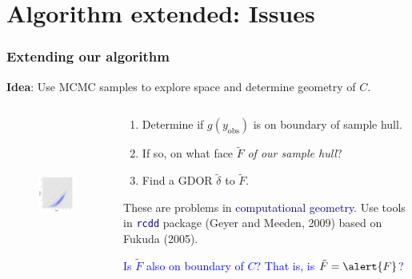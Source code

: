 \documentclass[ 10pt]{beamer}
\newcommand{\yobs}{y_{\text{obs}}}
\begin{document}
\section{Algorithm extended: Issues}
\frame
{
\frametitle{Extending our algorithm}  

\textbf{Idea}: Use MCMC samples to explore space and
determine geometry of $C$.
\vspace{1mm}

\begin{columns}[]
\begin{column}[T]{0.3\textwidth}
\begin{figure}[h]
\centering
\includegraphics[height=2in, trim=2.5in 1in 1in 1.9in, clip = true ]{MCsample-interiorptonF} %
\end{figure}
\end{column}

\begin{column}[t]{0.7\textwidth}
\pause

\begin{enumerate}
\item Determine if $g(\yobs)$ is on boundary of sample hull.
\vspace{2mm}
\item If so, on what face $\tilde{F}$ \emph{of our sample hull}?
\vspace{2mm}
\item Find a GDOR $\tilde{\delta}$ to $\tilde{F}$.   
\end{enumerate}
\vspace{2mm}
These are problems in \textcolor{darkblue}{computational geometry}.  Use tools in \textcolor{darkblue}{\texttt{rcdd}} package (Geyer and Meeden, 2009) based on Fukuda (2005).
\vspace{4mm}
\pause

\textcolor{blue}{Is $\tilde{F}$ also on boundary of $C$?  That is, is $\tilde{F} = \alert{F}$?}
\end{column}
\end{columns}
}
\end{document}
